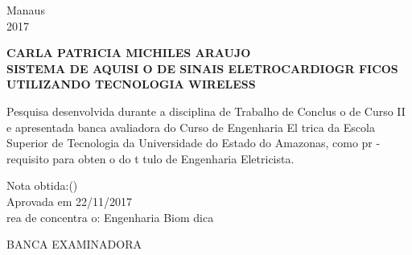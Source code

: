 \documentclass{article}
\begin{document}
\vspace*{\fill}
\begin{center}
Manaus \\ 2017
\end{center}





\newpage
\thispagestyle{empty}




\newpage
\thispagestyle{empty}
\begin{center}


\textbf{ {\bigsize CARLA PATRICIA MICHILES ARAUJO} \\[50pt] }
\textbf{ {\bigsize SISTEMA DE AQUISI O DE SINAIS ELETROCARDIOGR FICOS UTILIZANDO TECNOLOGIA WIRELESS}  \\[50pt] }
\end{center}
\hspace*{8cm}
\begin{flushright}
\begin{minipage}{8cm}
\begin{singlespace}
Pesquisa desenvolvida durante a disciplina de Trabalho de Conclus o de Curso II e apresentada   banca avaliadora do Curso de Engenharia El trica da Escola Superior de Tecnologia da Universidade do Estado do Amazonas, como pr -requisito para obten o do t tulo de Engenharia Eletricista.\\[30pt]
\end{singlespace}
\end{minipage}
\end{flushright}
\begin{center}
Nota obtida:\uline{\hspace{1cm}}(\uline{\hspace{8cm}})
\newline \\
Aprovada em 22/11/2017
\newline\\
 rea de concentra o: Engenharia Biom dica \,\,\,\,\,\,\,\,\,\,\,\,\,\,\,\,\,\,\,
\end{center}
\vspace{1.2cm}
\begin{center}
BANCA EXAMINADORA
\end{center}
\vspace{1.0cm}
\end{document}
